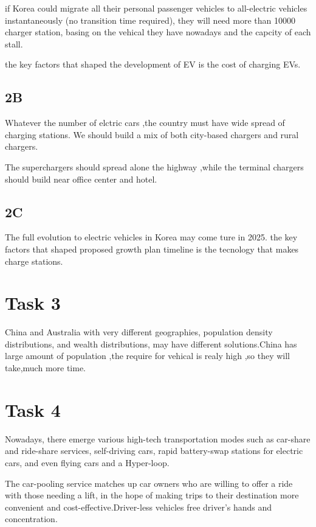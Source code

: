\documentclass{mcmthesis}
\begin{document}
if Korea could migrate all their personal passenger vehicles to all-electric vehicles instantaneously (no transition time required), they will need more than 10000 charger station, basing on the vehical they have nowadays and the capcity of each stall.

the key factors that shaped the development of EV is the cost of charging EVs. 

\subsection{2B}

Whatever the number of elctric cars ,the country must have wide spread of charging stations. We should build a mix of both city-based chargers and  rural chargers. 

The superchargers should spread alone the highway ,while the terminal chargers should build near office center and hotel.

\subsection{2C}

The full evolution to electric vehicles in Korea may come ture in 2025.
the key factors that shaped proposed growth plan timeline is the tecnology that makes charge stations.


\section{Task 3}

China and Australia with very different geographies, population density distributions, and wealth distributions, may have different solutions.China has large amount of population ,the require for vehical is realy high ,so they will take,much more time.



\section{Task 4}

Nowadays, there emerge various high-tech transportation modes such as car-share and ride-share services, self-driving cars, rapid battery-swap stations for electric cars, and even flying cars and a Hyper-loop.

 The car-pooling service matches up car owners who are willing to offer a ride with those needing a lift, in the hope of making trips to their destination more convenient and cost-effective.Driver-less vehicles free driver’s hands and concentration.
\end{document}
